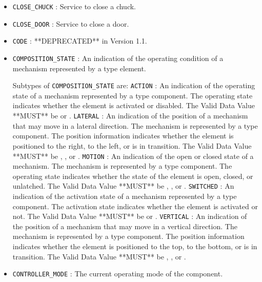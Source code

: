 \begin{itemize}
\item \texttt{CLOSE_CHUCK} : Service to close a chuck. 

\item \texttt{CLOSE_DOOR} : Service to close a door. 

\item \texttt{CODE} : **DEPRECATED** in Version 1.1. 

\item \texttt{COMPOSITION_STATE} : An indication of the operating condition of a mechanism represented by a  type element. 

Subtypes of \texttt{COMPOSITION_STATE} are: 
\newline\tab \texttt{ACTION} : An indication of the operating state of a mechanism represented by a  type component.
 The operating state indicates whether the  element is activated or disabled. 
 The \gls{Valid Data Value} **MUST** be  or . 
\newline\tab \texttt{LATERAL} : An indication of the position of a mechanism that may move in a lateral direction.   The mechanism is represented by a  type component. 
 The position information indicates whether the  element is positioned to the right, to the left, or is in transition.  
 The \gls{Valid Data Value} **MUST** be , , or . 
\newline\tab \texttt{MOTION} : An indication of the open or closed state of a mechanism.   The mechanism is represented by a  type component. 
 The operating state indicates whether the state of the  element is open, closed, or unlatched.   
 The \gls{Valid Data Value} **MUST** be , , or . 
\newline\tab \texttt{SWITCHED} : An indication of the activation state of a mechanism represented by a  type component.
 The activation state indicates whether the  element is activated or not.
 The \gls{Valid Data Value} **MUST** be  or . 
\newline\tab \texttt{VERTICAL} : An indication of the position of a mechanism that may move in a vertical direction. The mechanism is represented by a  type component. 
 The position information indicates whether the  element is positioned to the top, to the bottom, or is in transition.  
 The \gls{Valid Data Value} **MUST** be , , or . 
\item \texttt{CONTROLLER_MODE} : The current operating mode of the  component. 


\end{itemize}
